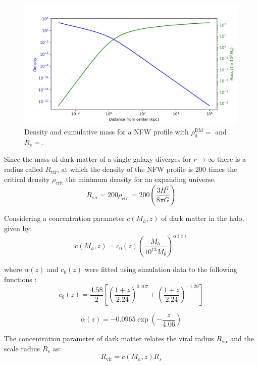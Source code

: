 		\begin{figure}[h]
			\centering
			\includegraphics[width=0.7\linewidth]{"../Files/Week 3/NFW_profile"}
			\caption{Density and cumulative mass for a NFW profile with $\rho_0^\text{DM} = $ and $R_s = $.}
		\end{figure}
		
		Since the mass of dark matter of a single galaxy diverges for $r \rightarrow \infty$ there is a radius called $R_\text{vir}$, at which the density of the NFW profile is 200 times the critical density $\rho_\text{crit}$ the minimum density for an expanding universe.
		\begin{equation}
			R_\text{vir} = 200 \rho_\text{crit} = 200 \left(\dfrac{3H^2}{8\pi G}\right)
		\end{equation}
		
		Considering a concentration parameter $c(M_h, z)$ of dark matter in the halo, given by:
		\begin{equation}
			c(M_h, z) = c_0(z)\left(\dfrac{M_h}{10^{13}M_\theta}\right)^{\alpha(z)}
		\end{equation}
		
		where $\alpha(z)$ and $c_0(z)$ were fitted using simulation data to the following functions \cite{choksi2017recoiling}:
		\begin{equation}
			c_0(z) = \dfrac{4.58}{2}\left[\left(\dfrac{1 + z}{2.24}\right)^{0.107} + \left(\dfrac{1 + z}{2.24}\right)^{-1.29}\right]
		\end{equation}
		
		\begin{equation}
			\alpha(z) = -0.0965 \exp\left(-\dfrac{z}{4.06}\right)
		\end{equation}
		
		The concentration parameter of dark matter relates the viral radius $R_\text{vir}$ and the scale radius $R_s$ as:
		\begin{equation}
			R_\text{vir} = c(M_h, z)R_s
		\end{equation}
		

